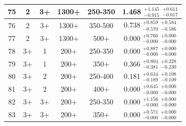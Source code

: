 \begin{table}[htbp]
\begin{centering}
\begin{tabular}{|c|c|c|c|c||c|}
\hline
75 &               2 &              3+ &           1300+ &         250-350 & 1.468 $^{+1.145}_{-0.915}$ $^{+0.611}_{-0.617}$ \\ 
\hline
76 &               2 &              3+ &           1300+ &         350-500 & 0.738 $^{+0.859}_{-0.570}$ $^{+0.584}_{-0.586}$ \\ 
\hline
77 &               2 &              3+ &           1300+ &            500+ & 0.000 $^{+0.766}_{-0.000}$ $^{+0.000}_{-0.000}$ \\ 
\hline
78 &              3+ &               1 &            200+ &         250-350 & 0.000 $^{+0.887}_{-0.000}$ $^{+0.000}_{-0.000}$ \\ 
\hline
79 &              3+ &               1 &            200+ &            350+ & 0.366 $^{+0.804}_{-0.381}$ $^{+0.228}_{-0.230}$ \\ 
\hline
80 &              3+ &               2 &            200+ &         250-400 & 0.181 $^{+0.634}_{-0.189}$ $^{+0.108}_{-0.109}$ \\ 
\hline
81 &              3+ &               2 &            200+ &            400+ & 0.000 $^{+0.645}_{-0.000}$ $^{+0.000}_{-0.000}$ \\ 
\hline
82 &              3+ &              3+ &            200+ &         250-350 & 0.000 $^{+1.156}_{-0.000}$ $^{+0.000}_{-0.000}$ \\ 
\hline
83 &              3+ &              3+ &            200+ &            350+ & 0.000 $^{+0.571}_{-0.000}$ $^{+0.000}_{-0.000}$ \\ 
\hline
\end{tabular}
\par\end{centering}
\end{table}
